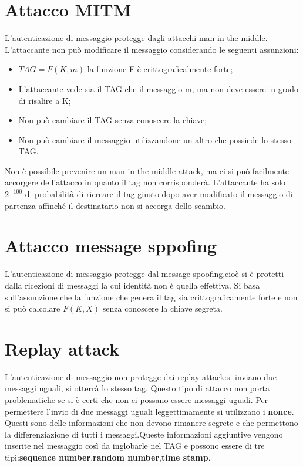 \documentclass{book}
\theoremstyle{remark}
\begin{document}
\section{Attacco MITM}
L'autenticazione di messaggio protegge dagli attacchi man in the middle\@. L'attaccante non può modificare il messaggio considerando le seguenti assunzioni:
\begin{itemize}
	\item \(TAG=F(K,m)\) la funzione F è crittograficalmente forte;\@
	\item L'attaccante vede sia il TAG che il messaggio m, ma non deve essere in grado di risalire a K;\@
	\item Non può cambiare il TAG senza conoscere la chiave;\@
	\item Non può cambiare il messaggio utilizzandone un altro che possiede lo stesso TAG\@.
\end{itemize}
Non è possibile prevenire un man in the middle attack, ma ci si può facilmente accorgere dell'attacco in quanto il tag non corrisponderà\@. L'attaccante ha solo \(2^{-100}\) di probabilità di ricreare il tag giusto dopo aver modificato il messaggio di partenza affinché il destinatario non si accorga dello scambio\@.
\section{Attacco message sppofing}
L'autenticazione di messaggio protegge dal message spoofing,cioè si è protetti dalla ricezioni di messaggi la cui identità non è quella effettiva\@. Si basa sull'assunzione che la funzione che genera il tag sia crittograficamente forte e non si può calcolare \(F(K,X)\) senza conoscere la chiave segreta\@.
\section{Replay attack}
L'autenticazione di messaggio non protegge dai replay attack:\@quando si inviano due messaggi uguali, si otterrà lo stesso tag\@. Questo tipo di attacco non porta problematiche se si è certi che non ci possano essere messaggi uguali\@.
Per permettere l'invio di due messaggi uguali leggettimamente si utilizzano i \textbf{nonce}\@. Questi sono delle informazioni che non devono rimanere segrete e che permettono la differenziazione di tutti i messaggi\@.\newline Queste informazioni aggiuntive vengono inserite nel messaggio così da inglobarle nel TAG e possono essere di tre tipi:\@\textbf{sequence number},\textbf{random number},\textbf{time stamp}\@.
\end{document}
